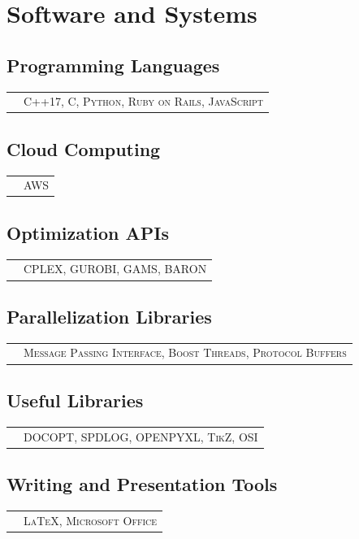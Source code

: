 \documentclass[10PT,letter]{article}
\newcommand{\subsectionstyle}[1]{\normalfont\selectfont\textcolor{titlecol}{\sffamily #1}}
\newcommand{\numbox}[1]{} %
\begin{document}
\section*{\numbox{9}\bfseries\textcolor{titlecol}{\sffamily Software and Systems}}
        	\subsection*{\subsectionstyle{Programming Languages}}
		            \begin{tabular}{p{0.2in}p{5.55in}}
		                & \textsc{C++17, C, Python, Ruby on Rails, JavaScript}
		            \end{tabular}
        
        \subsection*{\subsectionstyle{Cloud Computing}}
		        \begin{tabular}{p{.2in}p{5.55in}}
		        	 & \textsc{AWS}
		        \end{tabular}
    
   	  	\subsection*{\subsectionstyle{Optimization  APIs}}
			    \begin{tabular}{p{.2in}p{5.55in}}
			     	& 	\textsc{CPLEX, GUROBI, GAMS, BARON}
			    \end{tabular}
		 \subsection*{\subsectionstyle{Parallelization Libraries }}
				\begin{tabular}{p{.2in}p{5.55in}}
				 	& 	\textsc{Message Passing Interface, Boost Threads, Protocol Buffers}
				\end{tabular}

     	\subsection*{\subsectionstyle{Useful Libraries}}
				\begin{tabular}{p{.2in}p{5.55in}}
					& \textsc{DOCOPT,  SPDLOG, OPENPYXL, TikZ, OSI} 
				\end{tabular}

		\subsection*{\subsectionstyle{Writing and Presentation Tools}}
				\begin{tabular}{p{.2in}p{5.55in}}
					 & \textsc{\LaTeX, Microsoft Office}
				\end{tabular}
\end{document}
